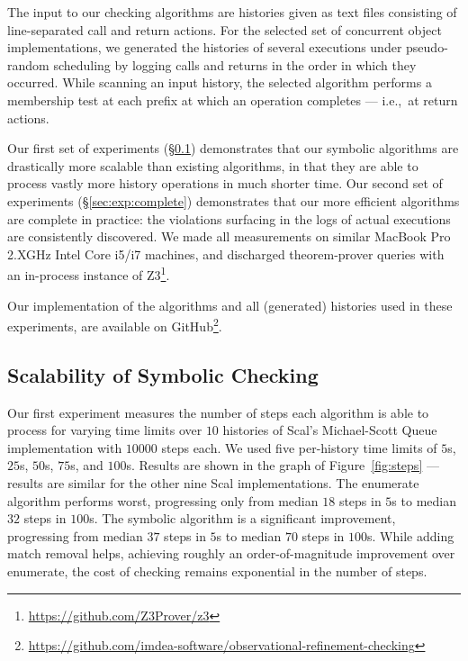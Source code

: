 The input to our checking algorithms are histories given as text files
consisting of line-separated call and return actions. For the selected set of
concurrent object implementations, we generated the histories of several
executions under pseudo-random scheduling by logging calls and returns in the
order in which they occurred. While scanning an input history, the selected
algorithm performs a membership test at each prefix at which an operation
completes --- i.e.,~at return actions.

Our first set of experiments (\S\ref{sec:exp:scalable}) demonstrates that our
symbolic algorithms are drastically more scalable than existing algorithms, in
that they are able to process vastly more history operations in much shorter
time. Our second set of experiments (\S\ref{sec:exp:complete}) demonstrates
that our more efficient algorithms are complete in practice: the violations
surfacing in the logs of actual executions are consistently discovered. We made
all measurements on similar MacBook Pro 2.XGHz Intel Core i5/i7 machines, and
discharged theorem-prover queries with an in-process instance of
Z3\footnote{\url{https://github.com/Z3Prover/z3}}.

Our implementation of the algorithms and all (generated) histories used in
these experiments, are available on
GitHub\footnote{\url{https://github.com/imdea-software/observational-refinement-checking}}.

\subsection{Scalability of Symbolic Checking}
\label{sec:exp:scalable}

Our first experiment measures the number of steps each algorithm is able to
process for varying time limits over $10$ histories of Scal’s Michael-Scott
Queue implementation with $10000$ steps each. We used five per-history time
limits of $5$s, $25$s, $50$s, $75$s, and $100$s. Results are shown in the graph
of Figure~\ref{fig:steps} — results are similar for the other nine Scal
implementations. The {\sc enumerate} algorithm performs worst, progressing only
from median $18$ steps in $5$s to median $32$ steps in $100$s. The {\sc
symbolic} algorithm is a significant improvement, progressing from median $37$
steps in $5$s to median $70$ steps in $100$s. While adding match removal helps,
achieving roughly an order-of-magnitude improvement over {\sc enumerate}, the
cost of checking remains exponential in the number of steps.

